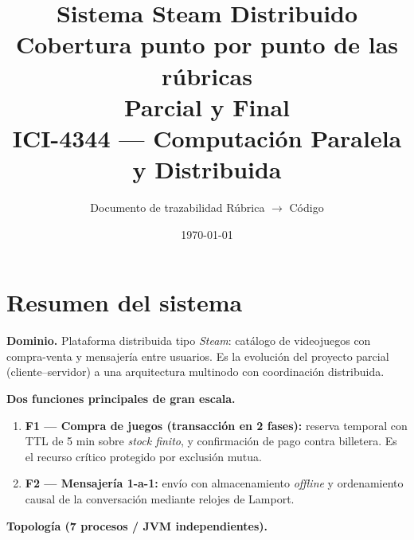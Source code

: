 \documentclass[11pt,a4paper]{article}
\title{\textbf{Sistema Steam Distribuido}\\[4pt]
\large Cobertura punto por punto de las rúbricas\\ Parcial y Final\\[6pt]
\normalsize ICI-4344 — Computación Paralela y Distribuida}
\author{Documento de trazabilidad Rúbrica $\rightarrow$ Código}
\date{\today}
\begin{document}
\maketitle
\thispagestyle{fancy}

\begin{center}
\end{center}

\tableofcontents
\newpage

\section{Resumen del sistema}

\textbf{Dominio.} Plataforma distribuida tipo \emph{Steam}: catálogo de videojuegos con
compra-venta y mensajería entre usuarios. Es la evolución del proyecto parcial
(cliente--servidor) a una arquitectura multinodo con coordinación distribuida.

\textbf{Dos funciones principales de gran escala.}
\begin{enumerate}[leftmargin=1.4em]
  \item \textbf{F1 — Compra de juegos (transacción en 2 fases):} reserva temporal con
        TTL de 5 min sobre \emph{stock finito}, y confirmación de pago contra billetera.
        Es el recurso crítico protegido por exclusión mutua.
  \item \textbf{F2 — Mensajería 1-a-1:} envío con almacenamiento \emph{offline} y
        ordenamiento causal de la conversación mediante relojes de Lamport.
\end{enumerate}

\textbf{Topología (7 procesos / JVM independientes).}
\end{document}
